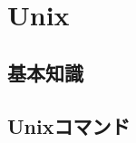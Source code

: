 \documentclass[main]{subfiles}
\begin{document}
\chapter{Unix}
\section{基本知識}
\section{Unixコマンド}
\fontsize{10.2}{10} \selectfont
\end{document}
